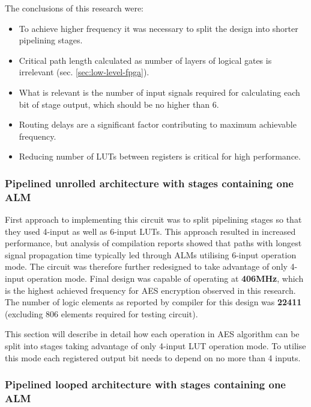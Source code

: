 The conclusions of this research were:
\begin{itemize}[noitemsep]
\item To achieve higher frequency it was necessary to split the design into shorter pipelining stages.
\item Critical path length calculated as number of layers of logical gates is irrelevant (sec. \ref{sec:low-level-fpga}).
\item What is relevant is the number of input signals required for calculating each bit of stage output, which should be no higher than 6.
\item Routing delays are a significant factor contributing to maximum achievable frequency.
\item Reducing number of LUTs between registers is critical for high performance.
\end{itemize}

\subsubsection{Pipelined unrolled architecture with stages containing one ALM}
\label{sec:implementation-pipe-unrolled-one-alm}

First approach to implementing this circuit was to split pipelining stages so that they used 4-input as well as 6-input LUTs. This approach resulted in increased performance, but analysis of compilation reports showed that paths with longest signal propagation time typically led through ALMs utilising 6-input operation mode. The circuit was therefore further redesigned to take advantage of only 4-input operation mode. Final design was capable of operating at \textbf{406MHz}, which is the highest achieved frequency for AES encryption observed in this research. The number of logic elements as reported by compiler for this design was \textbf{22411} (excluding 806 elements required for testing circuit).

This section will describe in detail how each operation in AES algorithm can be split into stages taking advantage of only 4-input LUT operation mode. To utilise this mode each registered output bit needs to depend on no more than 4 inputs.




\subsubsection{Pipelined looped architecture with stages containing one ALM}

